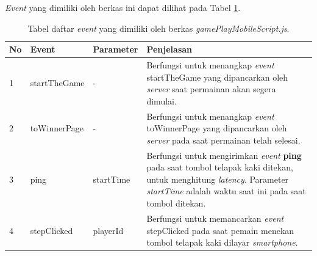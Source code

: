 \begin{enumerate}
\begin{enumerate}
\begin{enumerate}
			\textit{Event} yang dimiliki oleh berkas ini dapat dilihat pada Tabel \ref{table:event_gamePlayMobileScript}.
			\begin{table}[H]
				\centering
				\caption{Tabel daftar \textit{event} yang dimiliki oleh berkas \textit{gamePlayMobileScript.js}.}
				\begin{tabular}{|p{0.35cm}|p{3cm}|p{3cm}|p{7cm}|}
					\hline
					No & Event & Parameter & Penjelasan \\ \hline
					1 & startTheGame & - & Berfungsi untuk menangkap \textit{event} startTheGame yang dipancarkan oleh \textit{server} saat permainan akan segera dimulai. \\ \hline
					2 & toWinnerPage & - & Berfungsi untuk menangkap \textit{event} toWinnerPage yang dipancarkan oleh \textit{server} pada saat permainan telah selesai. \\ \hline
					3 & ping & startTime & Berfungsi untuk mengirimkan \textit{event} \textbf{ping} pada saat tombol telapak kaki ditekan, untuk menghitung \textit{latency}. Parameter \textit{startTime} adalah waktu saat ini pada saat tombol ditekan. \\ \hline
					4 & stepClicked & playerId & Berfungsi untuk memancarkan \textit{event} stepClicked pada saat pemain menekan tombol telapak kaki dilayar \textit{smartphone}. \\ \hline
				\end{tabular}
				\label{table:event_gamePlayMobileScript}
			\end{table}
%				
%				
%				
			

\end{enumerate}
\end{enumerate}
\end{enumerate}
